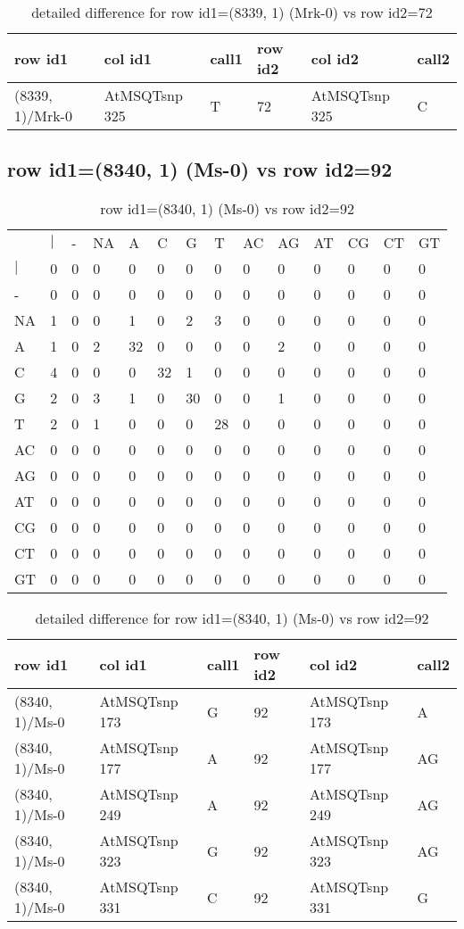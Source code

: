 \begin{center}
\begin{longtable}{|l|l|l|l|l|l|}
\caption{detailed difference for row id1=(8339, 1) (Mrk-0) vs row id2=72} \label{table_dm345}\\
\hline
row id1&col id1&call1&row id2&col id2&call2\\
\hline
(8339, 1)/Mrk-0&AtMSQTsnp 325&T&72&AtMSQTsnp 325&C\\
\hline
\end{longtable}
\end{center}

\subsection{row id1=(8340, 1) (Ms-0) vs row id2=92}
\begin{center}
\begin{longtable}{|l|l|l|l|l|l|l|l|l|l|l|l|l|l|}
\caption{row id1=(8340, 1) (Ms-0) vs row id2=92} \label{table_dm346}\\
\hline
\\
\hline
&$|$&-&NA&A&C&G&T&AC&AG&AT&CG&CT&GT\\
$|$&0&0&0&0&0&0&0&0&0&0&0&0&0\\
-&0&0&0&0&0&0&0&0&0&0&0&0&0\\
NA&1&0&0&1&0&2&3&0&0&0&0&0&0\\
A&1&0&2&32&0&0&0&0&2&0&0&0&0\\
C&4&0&0&0&32&1&0&0&0&0&0&0&0\\
G&2&0&3&1&0&30&0&0&1&0&0&0&0\\
T&2&0&1&0&0&0&28&0&0&0&0&0&0\\
AC&0&0&0&0&0&0&0&0&0&0&0&0&0\\
AG&0&0&0&0&0&0&0&0&0&0&0&0&0\\
AT&0&0&0&0&0&0&0&0&0&0&0&0&0\\
CG&0&0&0&0&0&0&0&0&0&0&0&0&0\\
CT&0&0&0&0&0&0&0&0&0&0&0&0&0\\
GT&0&0&0&0&0&0&0&0&0&0&0&0&0\\
\hline
\end{longtable}
\end{center}

\begin{center}
\begin{longtable}{|l|l|l|l|l|l|}
\caption{detailed difference for row id1=(8340, 1) (Ms-0) vs row id2=92} \label{table_dm347}\\
\hline
row id1&col id1&call1&row id2&col id2&call2\\
\hline
(8340, 1)/Ms-0&AtMSQTsnp 173&G&92&AtMSQTsnp 173&A\\
(8340, 1)/Ms-0&AtMSQTsnp 177&A&92&AtMSQTsnp 177&AG\\
(8340, 1)/Ms-0&AtMSQTsnp 249&A&92&AtMSQTsnp 249&AG\\
(8340, 1)/Ms-0&AtMSQTsnp 323&G&92&AtMSQTsnp 323&AG\\
(8340, 1)/Ms-0&AtMSQTsnp 331&C&92&AtMSQTsnp 331&G\\
\hline
\end{longtable}
\end{center}

